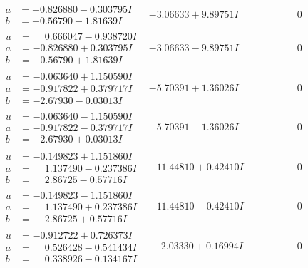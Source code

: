 \documentclass[1p]{elsarticle_modified}
\theoremstyle{definition}
\begin{document}
$$\begin{array}{c|c|c}
\begin{aligned}
a &= -0.826880 - 0.303795 I \\
b &= -0.56790 - 1.81639 I\end{aligned}
 & -3.06633 + 9.89751 I & \phantom{-0.000000 } 0 \\ \hline\begin{aligned}
u &= \phantom{-}0.666047 - 0.938720 I \\
a &= -0.826880 + 0.303795 I \\
b &= -0.56790 + 1.81639 I\end{aligned}
 & -3.06633 - 9.89751 I & \phantom{-0.000000 } 0 \\ \hline\begin{aligned}
u &= -0.063640 + 1.150590 I \\
a &= -0.917822 + 0.379717 I \\
b &= -2.67930 - 0.03013 I\end{aligned}
 & -5.70391 + 1.36026 I & \phantom{-0.000000 } 0 \\ \hline\begin{aligned}
u &= -0.063640 - 1.150590 I \\
a &= -0.917822 - 0.379717 I \\
b &= -2.67930 + 0.03013 I\end{aligned}
 & -5.70391 - 1.36026 I & \phantom{-0.000000 } 0 \\ \hline\begin{aligned}
u &= -0.149823 + 1.151860 I \\
a &= \phantom{-}1.137490 - 0.237386 I \\
b &= \phantom{-}2.86725 - 0.57716 I\end{aligned}
 & -11.44810 + 0.42410 I & \phantom{-0.000000 } 0 \\ \hline\begin{aligned}
u &= -0.149823 - 1.151860 I \\
a &= \phantom{-}1.137490 + 0.237386 I \\
b &= \phantom{-}2.86725 + 0.57716 I\end{aligned}
 & -11.44810 - 0.42410 I & \phantom{-0.000000 } 0 \\ \hline\begin{aligned}
u &= -0.912722 + 0.726373 I \\
a &= \phantom{-}0.526428 - 0.541434 I \\
b &= \phantom{-}0.338926 - 0.134167 I\end{aligned}
 & \phantom{-}2.03330 + 0.16994 I & \phantom{-0.000000 } 0 \\ \hline\begin{aligned}

\end{aligned}
\end{array}$$
\end{document}
